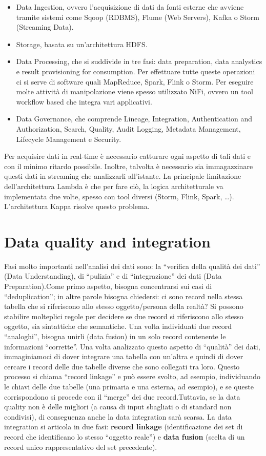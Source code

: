 \documentclass[a4page, 11pt]{article}
\begin{document}
\begin{itemize}[noitemsep]
\item Data Ingestion, ovvero l’acquisizione di dati da fonti esterne che avviene tramite sistemi come Sqoop (RDBMS), Flume (Web Servers), Kafka o Storm (Streaming Data).
\item Storage, basata su un’architettura HDFS.
\item Data Processing, che si suddivide in tre fasi: data preparation, data analystics e result provisioning for consumption. Per effettuare tutte queste operazioni ci si serve di software quali MapReduce, Spark, Flink o Storm. Per eseguire molte attività di manipolazione viene spesso utilizzato NiFi, ovvero un tool workflow based che integra vari applicativi.
\item Data Governance, che comprende Lineage, Integration, Authentication and Authorization, Search, Quality, Audit Logging, Metadata Management, Lifecycle Management e Security.
\end{itemize}
Per acquisire dati in real-time è necessario catturare ogni aspetto di tali dati e con il minimo ritardo possibile. Inoltre, talvolta è necessario sia immagazzinare questi dati in streaming che analizzarli all’istante. La principale limitazione dell’architettura Lambda è che per fare ciò, la logica architetturale va implementata due volte, spesso con tool diversi (Storm, Flink, Spark, …). L’architettura Kappa risolve questo problema.
\section{Data quality and integration}
Fasi molto importanti nell'analisi dei dati sono: la “verifica della qualità dei dati” (Data Understanding), di “pulizia” e di “integrazione” dei dati (Data Preparation).\newline Come primo aspetto, bisogna concentrarsi sui casi di “deduplication”; in altre parole bisogna chiedersi: ci sono record nella stessa tabella che si riferiscono allo stesso oggetto/persona della realtà? Si possono stabilire molteplici regole per decidere se due record si riferiscono allo stesso oggetto, sia sintattiche che semantiche. Una volta individuati due record “analoghi”, bisogna unirli (data fusion) in un solo record contenente le informazioni “corrette”. Una volta analizzato questo aspetto di “qualità” dei dati, immaginiamoci di dover integrare una tabella con un’altra e quindi di dover cercare i record delle due tabelle diverse che sono collegati tra loro. Questo processo si chiama “record linkage” e può essere svolto, ad esempio, individuando le chiavi delle due tabelle (una primaria e una esterna, ad esempio), e se queste corrispondono si procede con il “merge” dei due record.\newline Tuttavia, se la data quality non è delle migliori (a causa di input sbagliati o di standard non condivisi), di conseguenza anche la data integration sarà scarsa.\newline
La data integration si articola in due fasi: \textbf{record linkage} (identificazione dei set di record che identificano lo stesso “oggetto reale”) e \textbf{data fusion} (scelta di un record unico rappresentativo del set precedente).
\end{document}
